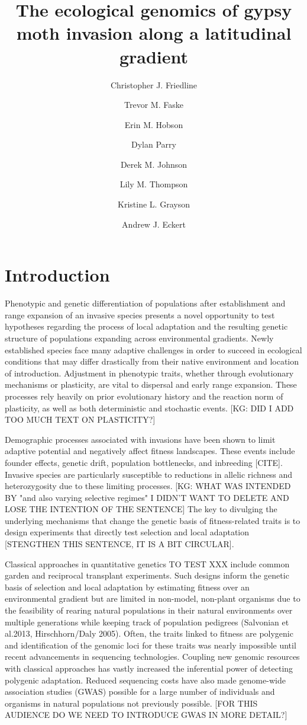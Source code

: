 \documentclass[fleqn,11pt]{wlpeerj}
\title{The ecological genomics of gypsy moth invasion along a latitudinal
gradient}
\author[1]{Christopher J. Friedline}
\author[1]{Trevor M. Faske}
\author[1]{Erin M. Hobson}
\author[2]{Dylan Parry}
\author[1]{Derek M. Johnson}
\author[3]{Lily M. Thompson}
\author[3,*]{Kristine L. Grayson}
\author[1,*,\textdagger]{Andrew J. Eckert}
\affil[1]{Department of Biology, Virginia Commonwealth University}
\affil[2]{College of Environmental Science and Forestry, State University of
New York}
\affil[3]{Department of Biology, University of Richmond}
\affil[*]{Authors contributed equally}
\affil[ \textdagger]{Corresponding author}
\begin{document}
\flushbottom
\maketitle
\thispagestyle{empty}

\linenumbers%

\section*{Introduction}


Phenotypic and genetic differentiation of populations after establishment and range expansion of an invasive species presents a novel opportunity to test hypotheses regarding the process of local adaptation and the resulting genetic structure of populations expanding across environmental gradients. Newly established species face many adaptive challenges in order to succeed in ecological conditions that may differ drastically from their native environment and location of introduction. Adjustment in phenotypic traits, whether through evolutionary mechanisms or plasticity, are vital to dispersal and early range expansion. These processes rely heavily on prior evolutionary history and the reaction norm of plasticity, as well as both deterministic and stochastic events. [KG: DID I ADD TOO MUCH TEXT ON PLASTICITY?]

Demographic processes associated with invasions have been shown to limit adaptive potential and negatively affect fitness landscapes. These events include founder effects, genetic drift, population bottlenecks, and inbreeding [CITE].  Invasive species are particularly susceptible to reductions in allelic richness and heterozygosity due to these limiting processes. [KG: WHAT WAS INTENDED BY "and also varying selective regimes" I DIDN'T WANT TO DELETE AND LOSE THE INTENTION OF THE SENTENCE]  The key to divulging the underlying mechanisms that change the genetic basis of fitness-related traits is to design experiments that directly test selection and local adaptation [STENGTHEN THIS SENTENCE, IT IS A BIT CIRCULAR].

Classical approaches in quantitative genetics TO TEST XXX include common garden and reciprocal transplant experiments. Such designs inform the genetic basis of selection and local adaptation by estimating fitness over an environmental gradient but are limited in non-model, non-plant organisms due to the feasibility of rearing natural populations in their natural environments over multiple generations while keeping track of population pedigrees (Salvonian et al.2013, Hirschhorn/Daly 2005). Often, the traits linked to fitness are polygenic and identification of the genomic loci for these traits was nearly impossible until recent advancements in sequencing technologies. Coupling new genomic resources with classical approaches has vastly increased the inferential power of detecting polygenic adaptation. Reduced sequencing costs have also made genome-wide association studies (GWAS) possible for a large number of individuals and organisms in natural populations not previously possible. [FOR THIS AUDIENCE DO WE NEED TO INTRODUCE GWAS IN MORE DETAIL?]
\end{document}

